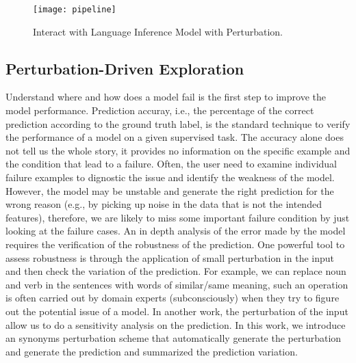 \begin{figure}[htbp]
\centering
\vspace{-2mm}
 \texttt{[image: pipeline]}
 \caption{Interact with Language Inference Model with Perturbation.}
\label{fig:modelPipeline}
\end{figure}

\subsection{Perturbation-Driven Exploration}

Understand where and how does a model fail is the first step to improve the
model performance.
Prediction accuray, i.e., the percentage of the correct prediction according to
the ground truth label, is the standard technique to verify the performance
of a model on a given supervised task.
%
The accuracy alone does not tell us the whole story, it provides no
information on the specific example and the condition that lead to a failure.
%
Often, the user need to examine individual failure examples to dignostic the
issue and identify the weakness of the model.
%
However, the model may be unstable and generate the right prediction for the wrong
reason (e.g., by picking up noise in the data that is not the intended features),
therefore, we are likely to miss some important failure condition by just looking
at the failure cases.
%
An in depth analysis of the error made by the model requires the verification of
the robustness of the prediction.
%
One powerful tool to assess robustness is through the application of small
perturbation in the input and then check the variation of the prediction.
%
For example, we can replace noun and verb in the sentences with words of
similar/same meaning, such an operation is often carried out by domain experts
(subconsciously) when they try to figure out the potential issue of a model.
%
In another work, the perturbation of the input allow us to do a sensitivity
analysis on the prediction.
%
In this work, we introduce an synonyms perturbation scheme that automatically
generate the perturbation and generate the prediction and summarized the prediction
variation.
%




